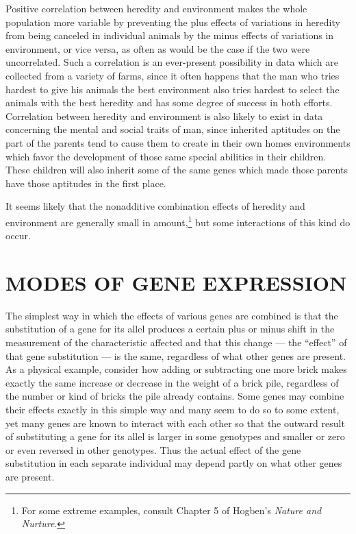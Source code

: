 Positive correlation between heredity and environment makes the
whole population more variable by preventing the plus effects of variations
in heredity from being canceled in individual animals by the
minus effects of variations in environment, or vice versa, as often as
would be the case if the two were uncorrelated. Such a correlation is an
ever-present possibility in data which are collected from a variety of
farms, since it often happens that the man who tries hardest to give his
animals the best environment also tries hardest to select the animals
with the best heredity and has some degree of success in both efforts.
Correlation between heredity and environment is also likely to exist in
data concerning the mental and social traits of man, since inherited
aptitudes on the part of the parents tend to cause them to create in their
own homes environments which favor the development of those same
special abilities in their children. These children will also inherit some
of the same genes which made those parents have those aptitudes in the
first place.

It seems likely that the nonadditive combination effects of heredity
and environment are generally small in amount,\footnote{For some extreme
examples, consult Chapter 5 of Hogben's \textit{Nature and Nurture}.}
but some interactions of this kind do occur.

\section*{MODES OF GENE EXPRESSION}

The simplest way in which the effects of various genes are combined
is that the substitution of a gene for its allel produces a certain plus or
minus shift in the measurement of the characteristic affected and that
this change --- the ``effect'' of that gene substitution --- is the same, regardless
of what other genes are present. As a physical example, consider
how adding or subtracting one more brick makes exactly the same
increase or decrease in the weight of a brick pile, regardless of the number
or kind of bricks the pile already contains. Some genes may combine
their effects exactly in this simple way and many seem to do so to some
extent, yet many genes are known to interact with each other so that the
outward result of substituting a gene for its allel is larger in some genotypes
and smaller or zero or even reversed in other genotypes. Thus the
actual effect of the gene substitution in each separate individual may
depend partly on what other genes are present.


